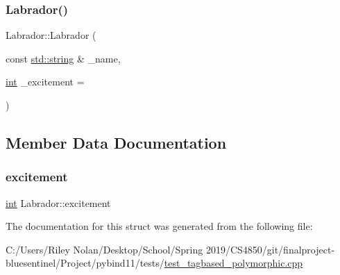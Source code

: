 \subsubsection{\texorpdfstring{Labrador()}{Labrador()}}
{\footnotesize\ttfamily Labrador\+::\+Labrador (\begin{DoxyParamCaption}\item[{const \mbox{\hyperlink{_s_d_l__opengl__glext_8h_ab4ccfaa8ab0e1afaae94dc96ef52dde1}{std\+::string}} \&}]{\+\_\+name,  }\item[{\mbox{\hyperlink{warnings_8h_a74f207b5aa4ba51c3a2ad59b219a423b}{int}}}]{\+\_\+excitement = {} }\end{DoxyParamCaption})\hspace{0.3cm}{\ttfamily [inline]}}



\subsection{Member Data Documentation}
\mbox{\label{struct_labrador_aaf0ccc73c8a7ac5a378c739ddea893c7}} 
\subsubsection{\texorpdfstring{excitement}{excitement}}
{\footnotesize\ttfamily \mbox{\hyperlink{warnings_8h_a74f207b5aa4ba51c3a2ad59b219a423b}{int}} Labrador\+::excitement}



The documentation for this struct was generated from the following file\+:\begin{DoxyCompactItemize}
\item 
C\+:/\+Users/\+Riley Nolan/\+Desktop/\+School/\+Spring 2019/\+C\+S4850/git/finalproject-\/bluesentinel/\+Project/pybind11/tests/\mbox{\hyperlink{test__tagbased__polymorphic_8cpp}{test\+\_\+tagbased\+\_\+polymorphic.\+cpp}}\end{DoxyCompactItemize}
